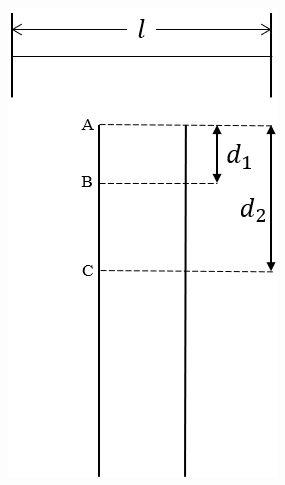 \begin{figure}[htbp]
\begin{minipage}{.25\columnwidth}
    \includegraphics[width=\columnwidth]{../graphs/osaka_ko_23_3-3.png}
    \caption{}
  \end{minipage}
\end{figure}

